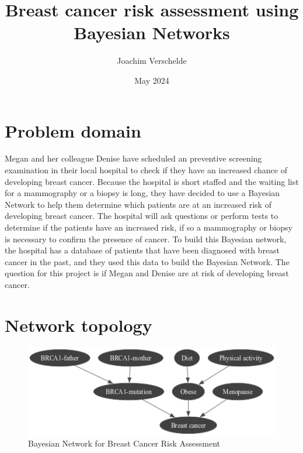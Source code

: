 \documentclass{article}
\title{Breast cancer risk assessment using Bayesian Networks}
\author{Joachim Verschelde}
\date{May 2024}
\begin{document}
\maketitle

\section{Problem domain}
Megan and her colleague Denise have scheduled an preventive screening examination in their local hospital to check if they have an increased chance of developing breast cancer. 
Because the hospital is short staffed and the waiting list for a mammography or a biopsy is long, they have decided to use a Bayesian Network to help them determine which patients are at an increased risk of developing breast cancer.
The hospital will ask questions or perform tests to determine if the patients have an increased risk, if so a mammography or biopsy is necessary to confirm the presence of cancer.
To build this Bayesian network, the hospital has a database of patients that have been diagnosed with breast cancer in the past, and they used this data to build the Bayesian Network. 
The question for this project is if Megan and Denise are at risk of developing breast cancer.
\section{Network topology}

\begin{figure}[H]
    \centering
    \includegraphics[width=\textwidth]{../figures/network.png}
    \caption{Bayesian Network for Breast Cancer Risk Assessment}
    \label{fig:bayesian_network}
\end{figure}
\end{document}
